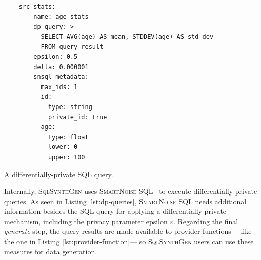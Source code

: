 \documentclass[11pt]{article}
\begin{document}
\begin{listing}[H]
\begin{verbatim}
    src-stats:
      - name: age_stats
        dp-query: >
          SELECT AVG(age) AS mean, STDDEV(age) AS std_dev
          FROM query_result
        epsilon: 0.5
        delta: 0.000001
        snsql-metadata:
          max_ids: 1
          id:
            type: string
            private_id: true
          age:
            type: float
            lower: 0
            upper: 100
\end{verbatim}
\caption{A differentially-private SQL query. }
\label{lst:dp-queries}
\end{listing}

Internally, \textsc{SqlSynthGen} uses \textsc{SmartNoise SQL}~\cite{allen2020opendp} to execute differentially private queries.
As seen in Listing \ref{lst:dp-queries}, \textsc{SmartNoise SQL} needs additional information besides the SQL query for applying a differentially private mechanism, including the privacy parameter epsilon $\varepsilon$.
Regarding the final \emph{generate} step, the query results are made available to provider functions ---like the one in Listing \ref{lst:provider-function}--- so \textsc{SqlSynthGen} users can use these measures for data generation. 




\end{document}

